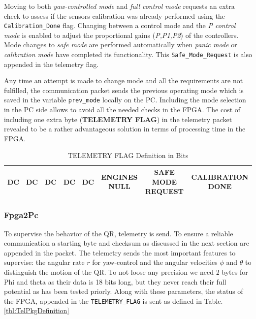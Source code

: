 \documentclass{article}
\begin{document}
Moving to both \textit{yaw-controlled mode} and \textit{full control mode} requests an extra check to assess if the sensors calibration was already performed using the \texttt{Calibration\_Done} flag. Changing between a control mode and the \textit{P control mode} is enabled to adjust the proportional gains (\textit{P,P1,P2}) of the controllers. Mode changes to \textit{safe mode} are performed automatically when \textit{panic mode} or \textit{calibration mode} have completed its functionality. This \texttt{Safe\_Mode\_Request} is also appended in the telemetry flag. 

Any time an attempt is made to change mode and all the requirements are not fulfilled, the communication packet sends the previous operating mode which is saved in the variable \texttt{prev\_mode} locally on the PC. Including the mode selection in the PC side allows to avoid all the needed checks in the FPGA. The cost of including one extra byte (\textbf{TELEMETRY FLAG}) in the telemetry packet revealed to be a rather advantageous solution in terms of processing time in the FPGA.

\begin{table}[h]
\centering
\begin{tabular}{|c|c|c|c|c|c|c|c|}
\hline 
DC & DC & DC & DC & DC & ENGINES NULL & SAFE MODE REQUEST & CALIBRATION DONE \\
\hline 
\end{tabular} 
\caption{TELEMETRY FLAG Definition in Bits}
\label{tbl:TelFlagDef}
\end{table}


\subsubsection{Fpga2Pc}
To supervise the behavior of the QR, telemetry is send. To ensure a reliable communication a starting byte and checksum as discussed in the next section are appended in the packet. The telemetry sends the most important features to supervise: the angular rate $r$ for yaw-control and the angular velocities $\phi$ and $\theta$ to distinguish the motion of the QR. To not loose any precision we need 2 bytes for Phi and theta as their data is 18 bits long, but they never reach their full potential as has been tested priorly. Along with these parameters, the status of the FPGA, appended in the \texttt{TELEMETRY\_FLAG} is sent as defined in Table. \ref{tbl:TelPkgDefinition} 
\end{document}
